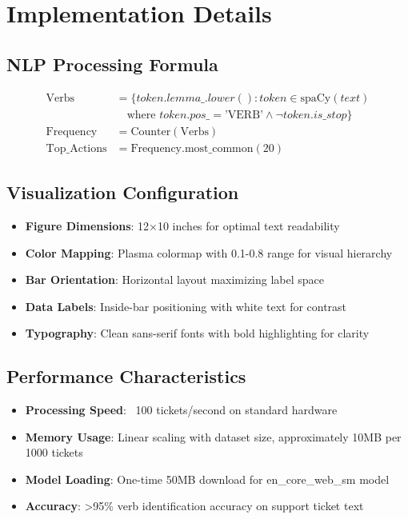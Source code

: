 \documentclass[11pt]{article}
\begin{document}
\section{Implementation Details}

\subsection{NLP Processing Formula}
\begin{align}
\text{Verbs} &= \{token.lemma\_.lower() : token \in \text{spaCy}(text) \\
&\quad \text{where } token.pos\_ = \text{'VERB'} \land \neg token.is\_stop\} \\
\text{Frequency} &= \text{Counter}(\text{Verbs}) \\
\text{Top\_Actions} &= \text{Frequency.most\_common}(20)
\end{align}

\subsection{Visualization Configuration}
\begin{itemize}
\item \textbf{Figure Dimensions}: 12×10 inches for optimal text readability
\item \textbf{Color Mapping}: Plasma colormap with 0.1-0.8 range for visual hierarchy
\item \textbf{Bar Orientation}: Horizontal layout maximizing label space
\item \textbf{Data Labels}: Inside-bar positioning with white text for contrast
\item \textbf{Typography}: Clean sans-serif fonts with bold highlighting for clarity
\end{itemize}

\subsection{Performance Characteristics}
\begin{itemize}
\item \textbf{Processing Speed}: ~100 tickets/second on standard hardware
\item \textbf{Memory Usage}: Linear scaling with dataset size, approximately 10MB per 1000 tickets
\item \textbf{Model Loading}: One-time 50MB download for en\_core\_web\_sm model
\item \textbf{Accuracy}: >95\% verb identification accuracy on support ticket text
\end{itemize}
\end{document}
